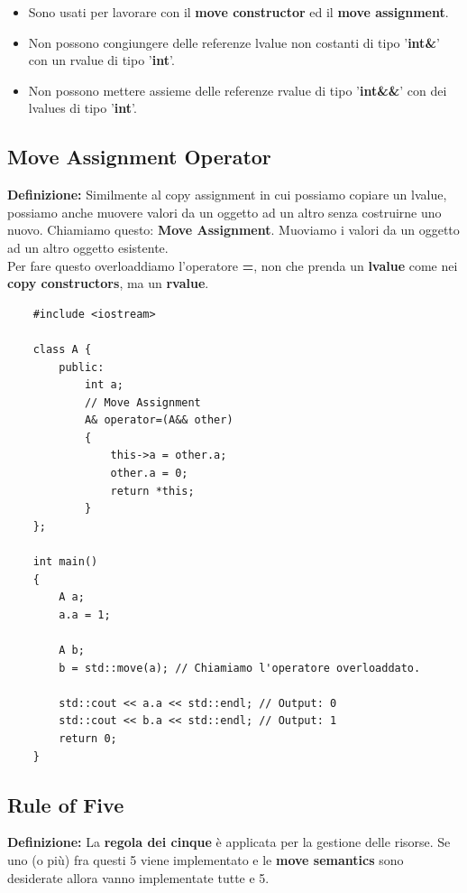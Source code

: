 \begin{itemize}
	\item \textsf{\small Sono usati per lavorare con il \textbf{move constructor} ed il \textbf{move assignment}.}
	\item \textsf{\small Non possono congiungere delle referenze lvalue non costanti di tipo '\textbf{int\&}' con un rvalue di tipo '\textbf{int}'.}
	\item \textsf{\small Non possono mettere assieme delle referenze rvalue di tipo '\textbf{int\&\&}' con dei lvalues di tipo '\textbf{int}'.}
\end{itemize}

\subsection{Move Assignment Operator}

\textsf{\small \textbf{Definizione: } Similmente al copy assignment in cui possiamo copiare un lvalue, possiamo anche muovere valori da un oggetto ad un altro senza costruirne uno nuovo. Chiamiamo questo: \textbf{Move Assignment}. Muoviamo i valori da un oggetto ad un altro oggetto esistente.} \\

\textsf{\small Per fare questo overloaddiamo l'operatore \textbf{=}, non che prenda un \textbf{lvalue} come nei \textbf{copy constructors}, ma un \textbf{rvalue}.} \\

\begin{lstlisting}
	#include <iostream>
	
	class A {
		public:
			int a;
			// Move Assignment
			A& operator=(A&& other)
			{
				this->a = other.a;
				other.a = 0;
				return *this;
			}
	};

	int main()
	{
		A a;
		a.a = 1;
		
		A b;
		b = std::move(a); // Chiamiamo l'operatore overloaddato. 
		
		std::cout << a.a << std::endl; // Output: 0
		std::cout << b.a << std::endl; // Output: 1
		return 0;
	}
\end{lstlisting}

\subsection{Rule of Five}

\textsf{\small \textbf{Definizione: } La \textbf{regola dei cinque} è applicata per la gestione delle risorse. Se uno (o più) fra questi 5 viene implementato e le \textbf{move semantics} sono desiderate allora vanno implementate tutte e 5. } \\

